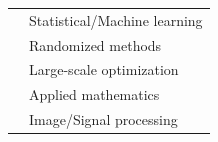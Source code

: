 \documentclass[letterpaper]{article}
\begin{document}
\begin{minipage}[t]{1\linewidth}
\begin{minipage}[t]{0.5\linewidth}
\begin{minipage}{1\linewidth}
\begin{minipage}{1\linewidth}
{			\begin{tabularx}{1\textwidth}{rX}
				\faCircle & Statistical/Machine learning\\
				\faCircle & Randomized methods\\
				\faCircle & Large-scale optimization\\
				\faCircle & Applied mathematics\\
				\faCircle & Image/Signal 
				processing\\								
			\end{tabularx}
			}
		\end{minipage}
	\end{minipage} %
\end{minipage}
\end{minipage}
\end{document}
